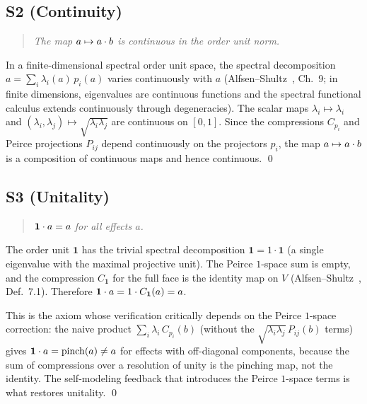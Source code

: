 \subsection*{S2 (Continuity)}

\begin{quote}
\emph{The map $a \mapsto \sp{a}{b}$ is continuous in the order unit
norm.}
\end{quote}

In a finite-dimensional spectral order unit space, the spectral
decomposition $a = \sum_i \lambda_i(a)\, p_i(a)$ varies continuously with
$a$ (Alfsen--Shultz~\cite{AlfsenShultz2003}, Ch.~9; in finite dimensions,
eigenvalues are continuous functions and the spectral functional calculus
extends continuously through degeneracies). The scalar maps
$\lambda_i \mapsto \lambda_i$ and
$(\lambda_i,\lambda_j)\mapsto\sqrt{\lambda_i\lambda_j}$ are continuous on
$[0,1]$. Since the compressions $C_{p_i}$ and Peirce projections $P_{ij}$
depend continuously on the projectors $p_i$, the map $a \mapsto \sp{a}{b}$
is a composition of continuous maps and hence continuous. \qed

\subsection*{S3 (Unitality)}

\begin{quote}
\emph{$\sp{\mathbf{1}}{a} = a$ for all effects $a$.}
\end{quote}

The order unit $\mathbf{1}$ has the trivial spectral decomposition
$\mathbf{1} = 1\cdot\mathbf{1}$ (a single eigenvalue with the maximal
projective unit). The Peirce $1$-space sum is empty, and the compression
$C_{\mathbf{1}}$ for the full face is the identity map on $V$
(Alfsen--Shultz~\cite{AlfsenShultz2003}, Def.~7.1). Therefore
$\sp{\mathbf{1}}{a} = 1 \cdot C_{\mathbf{1}}(a) = a$.

This is the axiom whose verification critically depends on the Peirce
$1$-space correction: the naive product $\sum_i \lambda_i\, C_{p_i}(b)$
(without the $\sqrt{\lambda_i\lambda_j}\,P_{ij}(b)$ terms) gives
$\sp{\mathbf{1}}{a} = \mathrm{pinch}(a) \ne a$ for effects with
off-diagonal components, because the sum of compressions over a resolution
of unity is the pinching map, not the identity. The self-modeling feedback
that introduces the Peirce $1$-space terms is what restores unitality. \qed

